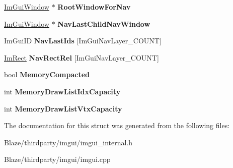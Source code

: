 \begin{DoxyCompactItemize}
\item 
\mbox{\label{structImGuiWindow_a949a4aa260a21e8a8d2f65ffbe789712}} 
\hyperlink{structImGuiWindow}{Im\+Gui\+Window} $\ast$ {\bfseries Root\+Window\+For\+Nav}
\item 
\mbox{\label{structImGuiWindow_a7255735a59782a09b4536e633e5153dd}} 
\hyperlink{structImGuiWindow}{Im\+Gui\+Window} $\ast$ {\bfseries Nav\+Last\+Child\+Nav\+Window}
\item 
\mbox{\label{structImGuiWindow_a1ff0db084ee889ee5d0846ce4f3dfe97}} 
Im\+Gui\+ID {\bfseries Nav\+Last\+Ids} \mbox{[}Im\+Gui\+Nav\+Layer\+\_\+\+C\+O\+U\+NT\mbox{]}
\item 
\mbox{\label{structImGuiWindow_ab2115773e21400dc96f7ff6d5a4ce13b}} 
\hyperlink{structImRect}{Im\+Rect} {\bfseries Nav\+Rect\+Rel} \mbox{[}Im\+Gui\+Nav\+Layer\+\_\+\+C\+O\+U\+NT\mbox{]}
\item 
\mbox{\label{structImGuiWindow_af24dffe06ae301fe592ccb3076ce1147}} 
bool {\bfseries Memory\+Compacted}
\item 
\mbox{\label{structImGuiWindow_a9bb2a4aceef6f9e2b41b965869a5d069}} 
int {\bfseries Memory\+Draw\+List\+Idx\+Capacity}
\item 
\mbox{\label{structImGuiWindow_a139cb0b35e070634619182cf153901c6}} 
int {\bfseries Memory\+Draw\+List\+Vtx\+Capacity}
\end{DoxyCompactItemize}


The documentation for this struct was generated from the following files\+:\begin{DoxyCompactItemize}
\item 
Blaze/thirdparty/imgui/imgui\+\_\+internal.\+h\item 
Blaze/thirdparty/imgui/imgui.\+cpp\end{DoxyCompactItemize}
